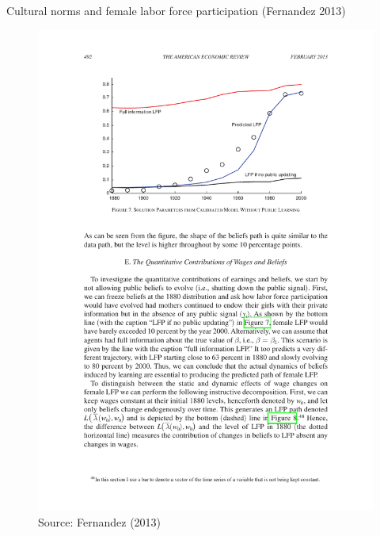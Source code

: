 \documentclass[compress, 8pt]{beamer}
\begin{document}
\begin{frame}{Cultural norms and female labor force participation (Fernandez 2013)}

\begin{figure}
\includegraphics[width=.9\textwidth]{fernandez_fig7.pdf}
\caption{Source: Fernandez (2013)}
\end{figure}

\end{frame}
\end{document}
